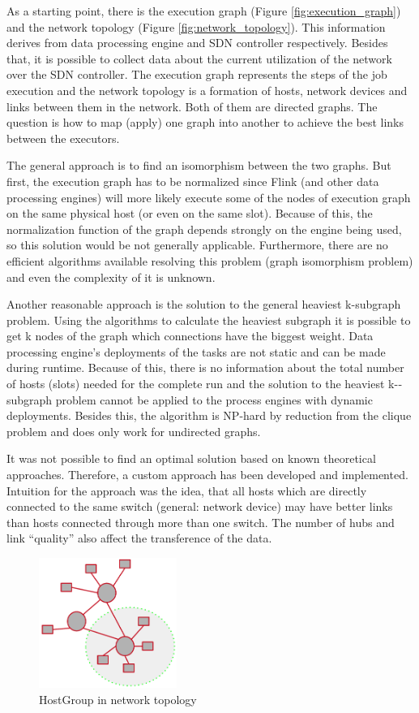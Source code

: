 As a starting point, there is the execution graph (Figure \ref{fig:execution_graph}) and the network
topology (Figure \ref{fig:network_topology}).  This information derives from data processing engine
and SDN controller respectively. Besides that, it is possible to collect data about the current
utilization of the network over the SDN controller.  The execution graph represents the steps of the
job execution and the network topology is a formation of hosts, network devices and links between
them in the network. Both of them are directed graphs. The question is how to map (apply) one graph
into another to achieve the best links between the executors.

The general approach is to find an isomorphism between the two graphs. But first, the execution
graph has to be normalized since Flink (and other data processing engines) will more likely execute
some of the nodes of execution graph on the same physical host (or even on the same slot). Because
of this, the normalization function of the graph depends strongly on the engine being used, so this
solution would be not generally applicable. Furthermore, there are no efficient algorithms available
resolving this problem (graph isomorphism problem) and even the complexity of it is
unknown.\cite{graph}

Another reasonable approach is the solution to the general heaviest k-subgraph problem. Using the
algorithms to calculate the heaviest subgraph it is possible to get k nodes of the graph which
connections have the biggest weight. Data processing engine’s deployments of the tasks are not
static and can be made during runtime. Because of this, there is no information about the total
number of hosts (slots) needed for the complete run and the solution to the heaviest k-­subgraph
problem cannot be applied to the process engines with dynamic deployments. Besides this, the
algorithm is NP­-hard by reduction from the clique problem and does only work for undirected graphs.
\cite{ksubgraph}

It was not possible to find an optimal solution based on known theoretical approaches. Therefore, a
custom approach has been developed and implemented. Intuition for the approach was the idea, that
all hosts which are directly connected to the same switch (general: network device) may have better
links than hosts connected through more than one switch. The number of hubs and link “quality” also
affect the transference of the data.

\begin{figure}[h]
    \centering
    \includegraphics[width=0.4\textwidth]{graphics/hostgroup.png}
    \caption{HostGroup in network topology}
    \label{fig:hostgroup}
\end{figure}


